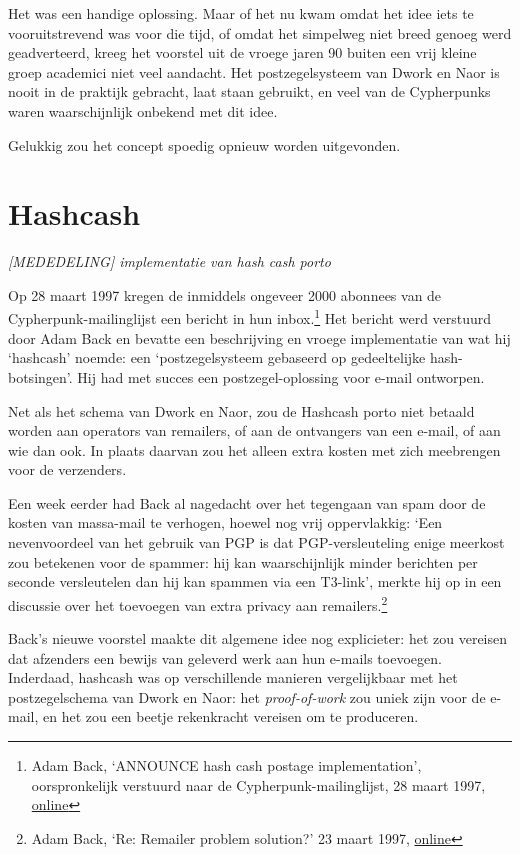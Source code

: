 \documentclass[smalldemyvopaper,11pt,twoside,onecolumn,openright,extrafontsizes,hidelinks]{memoir}
\begin{document}
Het was een handige oplossing. Maar of het nu kwam omdat het idee iets
te vooruitstrevend was voor die tijd, of omdat het simpelweg niet breed
genoeg werd geadverteerd, kreeg het voorstel uit de vroege jaren 90
buiten een vrij kleine groep academici niet veel aandacht. Het
postzegelsysteem van Dwork en Naor is nooit in de praktijk gebracht,
laat staan gebruikt, en veel van de Cypherpunks waren waarschijnlijk
onbekend met dit idee.

Gelukkig zou het concept spoedig opnieuw worden uitgevonden.

\section{Hashcash}\label{hashcash-1}

\emph{{[}MEDEDELING{]} implementatie van hash cash porto}

Op 28 maart 1997 kregen de inmiddels ongeveer 2000 abonnees van de
Cypherpunk-mailinglijst een bericht in hun inbox.\footnote{Adam Back,
  `ANNOUNCE hash cash postage implementation', oorspronkelijk verstuurd
  naar de Cypherpunk-mailinglijst, 28 maart 1997,
  \href{https://cypherpunks.venona.com/date/1997/03/msg00774.html}{online}}
Het bericht werd verstuurd door Adam Back en bevatte een beschrijving en
vroege implementatie van wat hij `hashcash' noemde: een
`postzegelsysteem gebaseerd op gedeeltelijke hash-botsingen'. Hij had
met succes een postzegel-oplossing voor e-mail ontworpen.

Net als het schema van Dwork en Naor, zou de Hashcash porto niet betaald
worden aan operators van remailers, of aan de ontvangers van een e-mail,
of aan wie dan ook. In plaats daarvan zou het alleen extra kosten met
zich meebrengen voor de verzenders.

Een week eerder had Back al nagedacht over het tegengaan van spam door
de kosten van massa-mail te verhogen, hoewel nog vrij oppervlakkig: `Een
nevenvoordeel van het gebruik van PGP is dat PGP-versleuteling enige
meerkost zou betekenen voor de spammer: hij kan waarschijnlijk minder
berichten per seconde versleutelen dan hij kan spammen via een T3-link',
merkte hij op in een discussie over het toevoegen van extra privacy aan
remailers.\footnote{Adam Back, `Re: Remailer problem solution?' 23 maart
  1997,
  \href{https://cypherpunks.venona.com/date/1997/03/msg00631.html}{online}}

Back's nieuwe voorstel maakte dit algemene idee nog explicieter: het zou
vereisen dat afzenders een bewijs van geleverd werk aan hun e-mails
toevoegen. Inderdaad, hashcash was op verschillende manieren
vergelijkbaar met het postzegelschema van Dwork en Naor: het
\emph{proof-of-work} zou uniek zijn voor de e-mail, en het zou een
beetje rekenkracht vereisen om te produceren.
\end{document}
